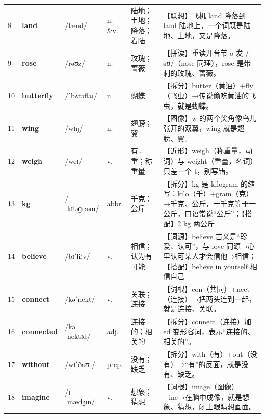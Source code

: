 \documentclass[UTF8,a4paper,11pt,oneside]{ctexbook}
\newcommand{\cellword}[1]{{\bfseries\textcolor{wordcol}{#1}}}
\newcommand{\cellipa}[1]{{\footnotesize\textcolor{ipacol}{#1}}}
\newcommand{\cellpos}[1]{\textcolor{poscol}{#1}}
\newcommand{\cellno}[1]{\textcolor{volcolor!75!black}{#1}}
\begin{document}
{\begin{longtable}{@{}C{0.045\textwidth}L{0.155\textwidth}L{0.175\textwidth}C{0.070\textwidth}L{0.180\textwidth}L{0.282\textwidth}@{}}
\cellno{8} & \cellword{land} & \cellipa{/lænd/} & \cellpos{n. \&v.} & 陆地；土地；降落；着陆 & \textcolor{tagAssoc}{【联想】}飞机 land 降落到 land 陆地上，一个词既是陆地、土地，又是降落。 \\
 \cellno{9} & \cellword{rose} & \cellipa{/rəʊz/} & \cellpos{n.} & 玫瑰；蔷薇 & \textcolor{tagSpell}{【拼读】}重读开音节 o 发 /əʊ/（nose 同理），rose 是带刺的玫瑰、蔷薇。 \\
\cellno{10} & \cellword{butterfly} & \cellipa{/ˈbʌtəflaɪ/} & \cellpos{n.} & 蝴蝶 & \textcolor{tagSplit}{【拆分】}butter（黄油）+fly（飞虫）→\allowbreak{}传说偷吃黄油的飞虫，就是蝴蝶。 \\
 \cellno{11} & \cellword{wing} & \cellipa{/wɪŋ/} & \cellpos{n.} & 翅膀；翼 & \textcolor{tagImage}{【图像】}w 的两个尖角像鸟儿张开的双翼，wing 就是翅膀、翼。 \\
\cellno{12} & \cellword{weigh} & \cellipa{/weɪ/} & \cellpos{v.} & 有…重；称重量 & \textcolor{tagNear}{【近形】}weigh（称重量，动词）与 weight（重量，名词）只差一个 t，别写错。 \\
 \cellno{13} & \cellword{kg} & \cellipa{/ˈkɪləɡræm/} & \cellpos{abbr.} & 千克；公斤 & \textcolor{tagSplit}{【拆分】}kg 是 kilogram 的缩写：kilo（千）+gram（克）→\allowbreak{}千克、公斤，一千克等于一公斤，口语常说“公斤”；\textcolor{tagColloc}{【搭配】}2 kg 两公斤 \\
\cellno{14} & \cellword{believe} & \cellipa{/bɪˈliːv/} & \cellpos{v.} & 相信；认为有可能 & \textcolor{tagEtym}{【词源】}believe 古义是“珍爱、认可”，与 love 同源→\allowbreak{}心里认可某人才会信他→\allowbreak{}相信；\textcolor{tagColloc}{【搭配】}believe in yourself 相信自己 \\
 \cellno{15} & \cellword{connect} & \cellipa{/kəˈnekt/} & \cellpos{v.} & 关联；连接 & \textcolor{tagRoot}{【词根】}con（共同）+nect（连接）→\allowbreak{}把两头连到一起，就是连接、关联。 \\
\cellno{16} & \cellword{connected} & \cellipa{/kəˈnektɪd/} & \cellpos{adj.} & 连接的；相关的 & \textcolor{tagSplit}{【拆分】}connect（连接）加 ed 变形容词，表示“连接的、相关的”。 \\
 \cellno{17} & \cellword{without} & \cellipa{/wɪˈðaʊt/} & \cellpos{prep.} & 没有；缺乏 & \textcolor{tagSplit}{【拆分】}with（有）+out（没有）→\allowbreak{}“有”的反面，就是没有、缺乏。 \\
\cellno{18} & \cellword{imagine} & \cellipa{/ɪˈmædʒɪn/} & \cellpos{v.} & 想象；猜想 & \textcolor{tagRoot}{【词根】}image（图像）+ine→\allowbreak{}在脑中成像，就是想象、猜想，闭上眼睛想画面。 \\

\end{longtable}}
\end{document}
